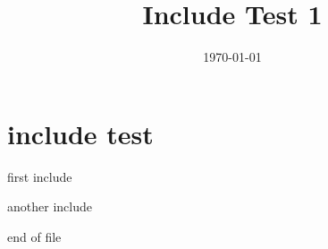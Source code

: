 \documentclass[12pt, english, a4paper]{article}
\begin{document}
\title{Include Test 1}
\date{\today}
\maketitle

\section{include test}

first include



another include



end of file
\end{document}
